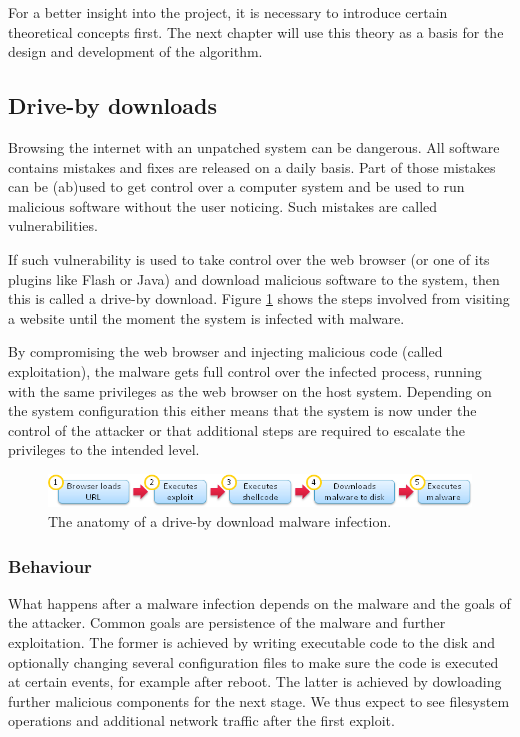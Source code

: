 For a better insight into the project, it is necessary to introduce certain theoretical concepts first. The next chapter will use this theory as a basis for the design and development of the algorithm.

\subsection{Drive-by downloads}

Browsing the internet with an unpatched system can be dangerous. All software contains mistakes and fixes are released on a daily basis. Part of those mistakes can be (ab)used to get control over a computer system and be used to run malicious software without the user noticing. Such mistakes are called vulnerabilities.

If such vulnerability is used to take control over the web browser (or one of its plugins like Flash or Java) and download malicious software to the system, then this is called a drive-by download\cite{Le2013}. Figure \ref{fig:dbdownload} shows the steps involved from visiting a website until the moment the system is infected with malware.

By compromising the web browser and injecting malicious code (called exploitation), the malware gets full control over the infected process, running with the same privileges as the web browser on the host system. Depending on the system configuration this either means that the system is now under the control of the attacker or that additional steps are required to escalate the privileges to the intended level.

\begin{figure}[h]
    \centering
    \includegraphics[width=12cm]{Images/drive-by-download.png}
    \caption{The anatomy of a drive-by download malware infection. \cite{dbdownload-anatomy}}
    \label{fig:dbdownload}
\end{figure}

\subsubsection{Behaviour}
\label{sec:behavior}

What happens after a malware infection depends on the malware and the goals of the attacker. Common goals are persistence of the malware and further exploitation. The former is achieved by writing executable code to the disk and optionally changing several configuration files to make sure the code is executed at certain events, for example after reboot. The latter is achieved by dowloading further malicious components for the next stage. We thus expect to see filesystem operations and additional network traffic after the first exploit.

